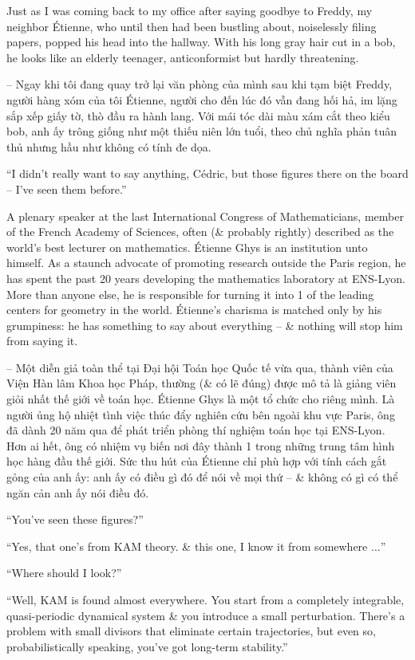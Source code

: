 \documentclass{article}
\begin{document}
\begin{enumerate}
	Just as I was coming back to my office after saying goodbye to {\sc Freddy}, my neighbor {\sc\'Etienne}, who until then had been bustling about, noiselessly filing papers, popped his head into the hallway. With his long gray hair cut in a bob, he looks like an elderly teenager, anticonformist but hardly threatening.
	
	-- Ngay khi tôi đang quay trở lại văn phòng của mình sau khi tạm biệt {\sc Freddy}, người hàng xóm của tôi {\sc\'Etienne}, người cho đến lúc đó vẫn đang hối hả, im lặng sắp xếp giấy tờ, thò đầu ra hành lang. Với mái tóc dài màu xám cắt theo kiểu bob, anh ấy trông giống như một thiếu niên lớn tuổi, theo chủ nghĩa phản tuân thủ nhưng hầu như không có tính đe dọa.
	
	``I didn't really want to say anything, C\'edric, but those figures there on the board -- I've seen them before.''
	
	A plenary speaker at the last International Congress of Mathematicians, member of the French Academy of Sciences, often (\& probably rightly) described as the world's best lecturer on mathematics. \'Etienne Ghys is an institution unto himself. As a staunch advocate of promoting research outside the Paris region, he has spent the past 20 years developing the mathematics laboratory at ENS-Lyon. More than anyone else, he is responsible for turning it into 1 of the leading centers for geometry in the world. {\sc\'Etienne}'s charisma is matched only by his grumpiness: he has something to say about everything -- \& nothing will stop him from saying it.
	
	-- Một diễn giả toàn thể tại Đại hội Toán học Quốc tế vừa qua, thành viên của Viện Hàn lâm Khoa học Pháp, thường (\& có lẽ đúng) được mô tả là giảng viên giỏi nhất thế giới về toán học. \'Etienne Ghys là một tổ chức cho riêng mình. Là người ủng hộ nhiệt tình việc thúc đẩy nghiên cứu bên ngoài khu vực Paris, ông đã dành 20 năm qua để phát triển phòng thí nghiệm toán học tại ENS-Lyon. Hơn ai hết, ông có nhiệm vụ biến nơi đây thành 1 trong những trung tâm hình học hàng đầu thế giới. Sức thu hút của {\sc\'Etienne} chỉ phù hợp với tính cách gắt gỏng của anh ấy: anh ấy có điều gì đó để nói về mọi thứ -- \& không có gì có thể ngăn cản anh ấy nói điều đó.
	
	``You've seen these figures?''
	
	``Yes, that one's from KAM theory. \& this one, I know it from somewhere $\ldots$''
	
	``Where should I look?''
	
	``Well, KAM is found almost everywhere. You start from a completely integrable, quasi-periodic dynamical system \& you introduce a small perturbation. There's a problem with small divisors that eliminate certain trajectories, but even so, probabilistically speaking, you've got long-term stability.''
	

\end{enumerate}
\end{document}
